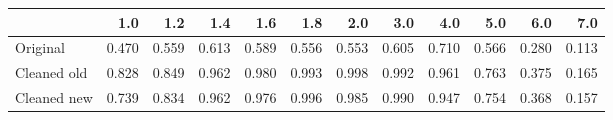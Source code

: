 \begin{tabular}{lrrrrrrrrrrr}
\toprule
{} &   1.0 &   1.2 &   1.4 &   1.6 &   1.8 &   2.0 &   3.0 &   4.0 &   5.0 &   6.0 &   7.0 \\
\midrule
Original    & 0.470 & 0.559 & 0.613 & 0.589 & 0.556 & 0.553 & 0.605 & 0.710 & 0.566 & 0.280 & 0.113 \\
Cleaned old & 0.828 & 0.849 & 0.962 & 0.980 & 0.993 & 0.998 & 0.992 & 0.961 & 0.763 & 0.375 & 0.165 \\
Cleaned new & 0.739 & 0.834 & 0.962 & 0.976 & 0.996 & 0.985 & 0.990 & 0.947 & 0.754 & 0.368 & 0.157 \\
\bottomrule
\end{tabular}
